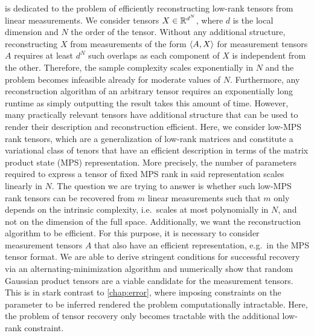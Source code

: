  is dedicated to the problem of efficiently reconstructing low-rank tensors from linear measurements.
We consider tensors $X \in {\mathbb{R}}^{d^N}$, where $d$ is the local dimension and $N$ the order of the tensor.
Without any additional structure, reconstructing $X$ from measurements of the form  $\braket{A, X}$ for measurement tensors $A$ requires at least $d^N$ such overlaps as each component of $X$ is independent from the other.
Therefore, the sample complexity scales exponentially in $N$ and the problem becomes infeasible already for moderate values of $N$.
Furthermore, any reconstruction algorithm of an arbitrary tensor requires an exponentially long runtime as simply outputting the result takes this amount of time.
However, many practically relevant tensors have additional structure that can be used to render their description and reconstruction efficient.
Here, we consider low-MPS rank tensors, which are a generalization of low-rank matrices and constitute a variational class of tenors that have an efficient description in terms of the matrix product state (MPS) representation.
More precisely, the number of parameters required to express a tensor of fixed MPS rank in said representation scales linearly in $N$.
The question we are trying to answer is whether such low-MPS rank tensors can be recovered from $m$ linear measurements such that $m$ only depends on the intrinsic complexity, i.e.\ scales at most polynomially in $N$, and not on the dimension of the full space.
Additionally, we want the reconstruction algorithm to be efficient.
For this purpose, it is necessary to consider measurement tensors $A$ that also have an efficient representation, e.g.\ in the MPS tensor format.
We are able to derive stringent conditions for successful recovery via an alternating-minimization algorithm and numerically show that random Gaussian product tensors are a viable candidate for the measurement tensors.
This is in stark contrast to \cref{chap:error}, where imposing constraints on the parameter to be inferred rendered the problem computationally intractable.
Here, the problem of tensor recovery only becomes tractable with the additional low-rank constraint.
